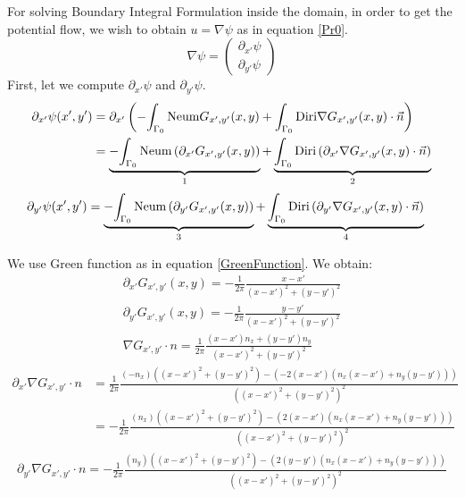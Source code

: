 \documentclass[a4paper,12pt]{article}
\newcommand{\integ}[3]{%
\ensuremath{\displaystyle{\int^{#2}_{#1} #3}}}
\begin{document}
For solving Boundary Integral Formulation inside the domain, in order to get the potential flow, we wish to obtain $u=\nabla\psi$ as in equation \eqref{Pr0}.
\begin{equation}
 \nabla\psi=\left(\begin{array}{c}
      \partial_{x'}\psi \\
      \partial_{y'}\psi
    \end{array}\right) \label{nablaPsi}
\end{equation}
First, let we compute $\partial_{x'}\psi$ and $\partial_{y'}\psi$.
\begin{align}
 \partial_{x'}\psi(x',y')&=\partial_{x'}\left(-\integ{\Gamma_0}{}{\text{Neum}G_{x',y'}(x,y)} + \integ{\Gamma_0}{}{\text{Diri}\nabla G_{x',y'}(x,y)\cdot \vec{n}} \right)\\
&=  \underbrace{-\integ{\Gamma_0}{}{\text{Neum} \left(\partial_{x'}G_{x',y'}(x,y)\right)}}_\text{1}  +  
\underbrace{\integ{\Gamma_0}{}{\text{Diri}\left(\partial_{x'}\nabla G_{x',y'}(x,y)\cdot \vec{n}\right)}}_\text{2}\label{partialxaPsi} 
\end{align}
\begin{align}
 \partial_{y'}\psi(x',y')&=  \underbrace{-\integ{\Gamma_0}{}{\text{Neum} \left(\partial_{y'}G_{x',y'}(x,y)\right)}}_\text{3}  +  
\underbrace{\integ{\Gamma_0}{}{\text{Diri}\left(\partial_{y'}\nabla G_{x',y'}(x,y)\cdot \vec{n}\right)}}_\text{4} \label{partialyaPsi}
\end{align}

We use Green function as in equation \ref{GreenFunction}. We obtain:
\begin{align}
 \partial_{x'} G_{x',y'}(x,y)=-\frac{1}{2\pi}\frac{x-x'}{(x-x')^2+(y-y')^2}\\ \label{partialxaG}
\partial_{y'} G_{x',y'}(x,y)=-\frac{1}{2\pi}\frac{y-y'}{(x-x')^2+(y-y')^2} \\ \label{partialyaG}
\nabla G_{x',y'} \cdot n= \frac{1}{2\pi} \frac{(x-x')n_x+(y-y')n_y}{(x-x')^2+(y-y')^2}
\end{align}
\begin{align}
 \partial_{x'}\nabla G_{x',y'} \cdot n &=\frac{1}{2\pi} \frac{(-n_x)((x-x')^2+(y-y')^2)-(-2(x-x')(n_x(x-x')+n_y(y-y')))}{((x-x')^2+(y-y')^2)^2}\\
&= -\frac{1}{2\pi}  \frac{(n_x)((x-x')^2+(y-y')^2)-(2(x-x')(n_x(x-x')+n_y(y-y')))}{((x-x')^2+(y-y')^2)^2} \label{partialxaNablaGn}
\end{align}
\begin{align}
 \partial_{y'}\nabla G_{x',y'} \cdot n =-\frac{1}{2\pi}  \frac{(n_y)((x-x')^2+(y-y')^2)-(2(y-y')(n_x(x-x')+n_y(y-y')))}{((x-x')^2+(y-y')^2)^2}\label{partialyaNablaGn}
\end{align}
\end{document}
